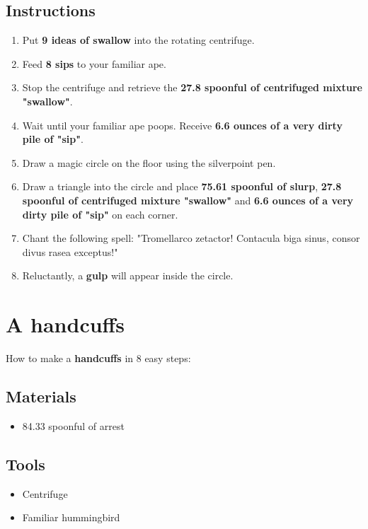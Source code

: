 \documentclass{article}
\begin{document}
\subsection{Instructions}\begin{enumerate}
\item 
Put \textbf{9 ideas of swallow} into the rotating centrifuge.
\item 
Feed \textbf{8 sips} to your familiar ape.
\item 
Stop the centrifuge and retrieve the \textbf{27.8 spoonful of centrifuged mixture "swallow"}.
\item 
Wait until your familiar ape poops. Receive \textbf{6.6 ounces of a very dirty pile of "sip"}.
\item 
Draw a magic circle on the floor using the silverpoint pen.
\item 
Draw a triangle into the circle and place \textbf{75.61 spoonful of slurp}, \textbf{27.8 spoonful of centrifuged mixture "swallow"} and \textbf{6.6 ounces of a very dirty pile of "sip"} on each corner.
\item 
Chant the following spell: "Tromellarco zetactor! Contacula biga sinus, consor divus rasea exceptus!"
\item 
Reluctantly, a \textbf{gulp} will appear inside the circle.
\end{enumerate}
\newpage
\section{A handcuffs}How to make a \textbf{handcuffs} in 8 easy steps:

\subsection{Materials}\begin{itemize}
\item 
84.33 spoonful of arrest
\end{itemize}
\subsection{Tools}\begin{itemize}
\item 
Centrifuge
\item 
Familiar hummingbird
\end{itemize}
\end{document}
